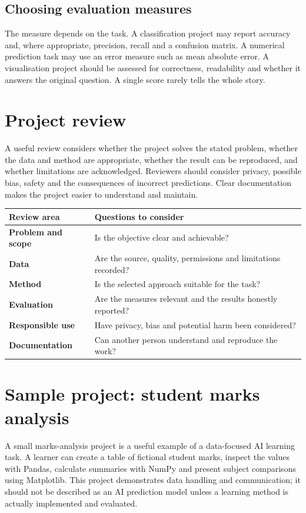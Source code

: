 \documentclass[11pt,openany,oneside]{book}
\begin{document}
\subsection{Choosing evaluation measures}
The measure depends on the task. A classification project may report accuracy and, where appropriate, precision, recall and a confusion matrix. A numerical prediction task may use an error measure such as mean absolute error. A visualisation project should be assessed for correctness, readability and whether it answers the original question. A single score rarely tells the whole story.

\section{Project review}
A useful review considers whether the project solves the stated problem, whether the data and method are appropriate, whether the result can be reproduced, and whether limitations are acknowledged. Reviewers should consider privacy, possible bias, safety and the consequences of incorrect predictions. Clear documentation makes the project easier to understand and maintain.

\begin{center}
\begin{tabularx}{\textwidth}{>{\bfseries}p{}X}
\toprule
Review area & Questions to consider\\
\midrule
Problem and scope & Is the objective clear and achievable?\\
Data & Are the source, quality, permissions and limitations recorded?\\
Method & Is the selected approach suitable for the task?\\
Evaluation & Are the measures relevant and the results honestly reported?\\
Responsible use & Have privacy, bias and potential harm been considered?\\
Documentation & Can another person understand and reproduce the work?\\
\bottomrule
\end{tabularx}
\end{center}

\section{Sample project: student marks analysis}
A small marks-analysis project is a useful example of a data-focused AI learning task. A learner can create a table of fictional student marks, inspect the values with Pandas, calculate summaries with NumPy and present subject comparisons using Matplotlib. This project demonstrates data handling and communication; it should not be described as an AI prediction model unless a learning method is actually implemented and evaluated.
\end{document}
